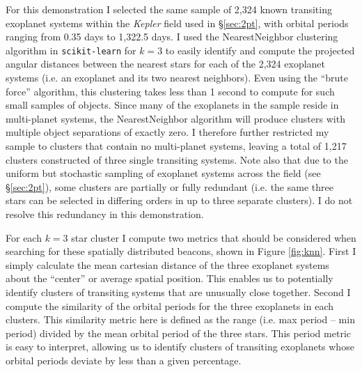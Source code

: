 \documentclass[twocolumn]{aastex62}
\newcommand{\Kepler}{\textsl{Kepler}\xspace}
\begin{document}
For this demonstration I selected the same sample of 2,324 known transiting exoplanet systems within the \Kepler field used in \S\ref{sec:2pt}, with orbital periods ranging from 0.35 days to 1,322.5 days. 
I used the NearestNeighbor clustering algorithm in {\tt scikit-learn} for $k=3$ to easily identify and compute the projected angular distances between the nearest stars for each of the 2,324 exoplanet systems (i.e. an exoplanet and its two nearest neighbors). Even using the ``brute force'' algorithm, this clustering takes less than 1 second to compute for such small samples of objects. Since many of the exoplanets in the sample reside in multi-planet systems, the NearestNeighbor algorithm will produce clusters with multiple object separations of exactly zero. I therefore further restricted my sample to clusters that contain no multi-planet systems, leaving a total of 1,217 clusters constructed of three single transiting systems. Note also that due to the uniform but stochastic sampling of exoplanet systems across the field (see \S\ref{sec:2pt}), some clusters are partially or fully redundant (i.e. the same three stars can be selected in differing orders in up to three separate clusters). I do not resolve this redundancy in this demonstration.

For each $k=3$ star cluster I compute two metrics that should be considered when searching  for these spatially distributed beacons, shown in Figure \ref{fig:knn}. First I simply calculate the mean cartesian distance of the three exoplanet  systems about the ``center'' or average spatial position. This enables us to potentially identify clusters of transiting systems that are unusually close together. Second I compute the similarity of the orbital periods for the three exoplanets in each clusters. This similarity metric here is defined as the range (i.e. max period -- min period) divided by the mean orbital period of the three stars.
This period metric is easy to interpret, allowing us to identify clusters of transiting exoplanets whose orbital periods deviate by less than a given percentage.

\end{document}
